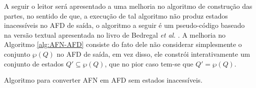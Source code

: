 A seguir o leitor será apresentado a uma melhoria no algoritmo de construção das partes, no sentido de que, a execução de tal algoritmo não produz estados inacessíveis no AFD de saída, o algoritmo a seguir é um pseudo-código baseado na versão textual apresentada no livro de Bedregal \textit{et al.} \cite{benjaLivro2010}. A melhoria no Algoritmo \ref{alg:AFN-AFD} consiste do fato dele não considerar simplesmente o conjunto $\wp(Q)$ no AFD de saída, em vez disso, ele constrói interativamente um conjunto de estados $Q' \subseteq \wp(Q)$, que no pior caso tem-se que $Q' = \wp(Q)$.

\begin{algorithm}[H]
	\caption{Algoritmo para converter AFN em AFD sem estados inacessíveis.}
	\label{alg:AFN-AFD}
\end{algorithm}

